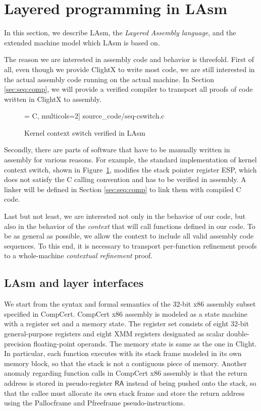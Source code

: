 
\section{Layered programming in LAsm}
\label{sec:seq:lasm}

In this section, we describe LAsm, the \emph{Layered
  Assembly language}, and the extended machine model which LAsm is based on.

The reason we are interested in assembly code and behavior is
threefold.  First of all, even though we provide ClightX to write most
code, we are still interested in the actual assembly code running on
the actual machine. In Section \ref{sec:seq:comp}, we will provide a
verified compiler to transport all proofs of code written in ClightX
to assembly.

\begin{figure}[t]\centering
 = C, multicols=2] {source_code/seq-cswitch.c}
\caption{Kernel context switch verified in LAsm}
\label{fig:contextswitch}
\hrulefill
\end{figure}

Secondly, there are parts of software that have to be manually written
in assembly for various reasons. For example, the standard
implementation of kernel context switch, shown in
Figure~\ref{fig:contextswitch}, 
modifies the stack pointer register
\textsf{ESP}, which does not satisfy the C calling convention and has
to be verified in assembly.  A linker will be defined in Section
\ref{sec:seq:comp} to link them with compiled C code.

Last but not least, we are interested not only in the behavior of our
code, but also in the behavior of the \emph{context} that will call
functions defined in our code. To be as general as possible, we allow
the context to include all valid assembly code sequences. To this end,
it is necessary to transport per-function refinement proofs to a
whole-machine \emph{contextual refinement} proof.


  \subsection{LAsm and layer interfaces}

We start from the syntax and formal semantics of the 32-bit x86
assembly subset specified in CompCert.
CompCert x86 assembly is
modeled as a state machine with a register set and a memory state. 
The register set
consists of eight 32-bit general-purpose registers and eight XMM registers
designated as scalar double-precision floating-point operands.
The memory state is same as the one in Clight.
In particular, each function executes with its stack frame modeled in its
own memory block, so that the stack is not a contiguous piece of
memory.
Another anomaly regarding function calls in CompCert x86 assembly is that
the return address is stored in pseudo-register $\mathsf{RA}$ instead of
being pushed onto the stack, so
that the callee must allocate its own stack frame and
store the return address 
using the \textsf{Pallocframe} and
\textsf{Pfreeframe} pseudo-instructions.

